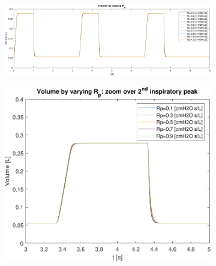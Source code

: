 \begin{figure}[t!]
\begin{subfigure}{0.5\linewidth}
		\caption{}
	\end{subfigure}\hfill
	\caption{}
	\begin{subfigure}{0.7\linewidth}
		\centering
		\includegraphics[width=0.95\linewidth]{../model/data_log/Rp_volume_total.pdf}
		\caption{}
	\end{subfigure}\hfill
	\begin{subfigure}{0.3\linewidth}
		\centering
		\includegraphics[width=0.95\linewidth]{../model/data_log/Rp_volume_zoom.pdf}
		\caption{}
	\end{subfigure}\hfill
	\caption{}
\end{figure}


